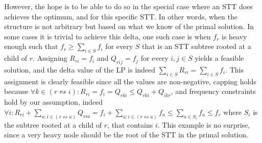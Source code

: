However, the hope is to be able to do so in the special case where an STT does achieves the optimum, and for this specific STT. In other words, when the structure is not arbitrary but based on what we know of the primal solution. In some cases it is trivial to achieve this delta, one such case is when $f_r$ is heavy enough such that $f_r \ge \sum_{i \in S}{f_i}$ for every $S$ that is an STT subtree rooted at a child of $r$. Assigning $R_{ri} = f_i$ and $Q_{rij} = f_j$ for every $i,j \in S$ yields a feasible solution, and the delta value of the LP is indeed $\sum_{i \in S}{R_{ri}} = \sum_{i \in S}{f_i}$. This assignment is clearly feasible since all the values are non-negative, capping holds because $\forall k \in (r \leftrightsquigarrow i): R_{ri} = f_i = Q_{rki} \le Q_{rki} + Q_{ikr}$, and frequency constraints hold by our assumption, indeed $\forall i: R_{ri} + \sum_{a:i \in (r \leftrightsquigarrow a)}{Q_{ria}} = f_i + \sum_{a:i \in (r \leftrightsquigarrow a)}{f_a} \le \sum_{a \in S_i}{f_a} \le f_r$ where $S_i$ is the subtree rooted at a child of $r$, that contains $i$. This example is no surprise, since a very heavy node should be the root of the STT in the primal solution.

